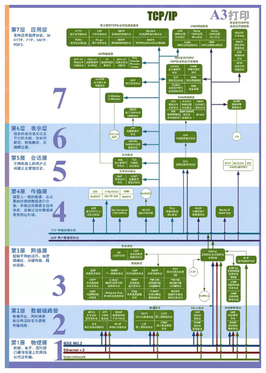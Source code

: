 \documentclass[UTF8]{article}%
\begin{document}
\begin{figure}[htb!]%
    \includegraphics[width=1.3\textwidth]{Fina.jpg}
    \label{fig::100}
\end{figure} 
\end{document}
